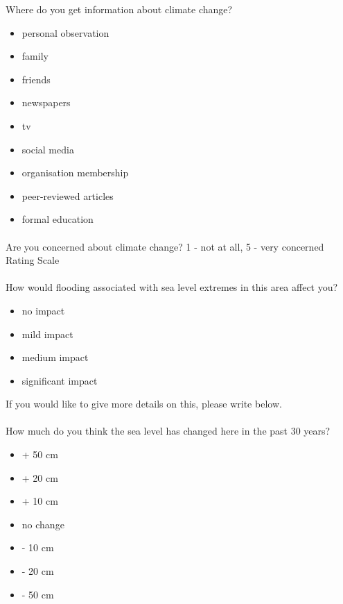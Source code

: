 Where do you get information about climate change?
\begin{itemize}
    \item personal observation
    \item family
    \item friends
    \item newspapers
    \item tv
    \item social media
    \item organisation membership
    \item peer-reviewed articles
    \item formal education
\end{itemize}

\paragraph{}
Are you concerned about climate change?
1 - not at all, 5 - very concerned
Rating Scale

\paragraph{}
How would flooding associated with sea level extremes in this area affect you?
\begin{itemize}
    \item no impact
    \item mild impact
    \item medium impact
    \item significant impact
\end{itemize}
If you would like to give more details on this, please write below.
\paragraph{}

How much do you think the sea level has changed here in the past 30 years?
\begin{itemize}
    \item + 50 cm
    \item + 20 cm
    \item + 10 cm
    \item no change
    \item - 10 cm
    \item - 20 cm 
    \item - 50 cm 
\end{itemize}
\paragraph{}

